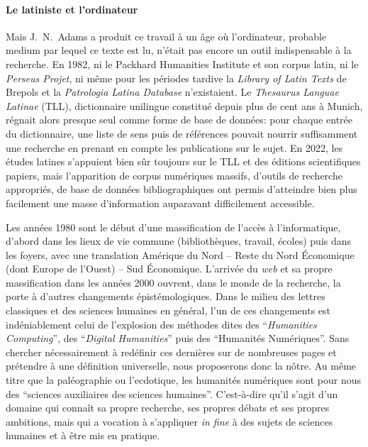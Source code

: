\paragraph{Le latiniste et l'ordinateur}

Mais J.~N.~Adams a produit ce travail à un âge où l'ordinateur, probable medium par lequel ce texte est lu, n'était pas encore un outil indispensable à la recherche. En 1982, ni le Packhard Humanities Institute et son corpus latin, ni le \textit{Perseus Projet}, ni même pour les périodes tardive la \textit{Library of Latin Texts} de Brepols et la \textit{Patrologia Latina Database} n'existaient. Le \textit{Thesaurus Languae Latinae} (TLL), dictionnaire unilingue constitué depuis plus de cent ans à Munich, régnait alors presque seul comme forme de base de données: pour chaque entrée du dictionnaire, une liste de sens puis de références pouvait nourrir suffisamment une recherche en prenant en compte les publications sur le sujet. En 2022, les études latines s'appuient bien sûr toujours sur le TLL et des éditions scientifiques papiers, mais l'apparition de corpus numériques massifs, d'outils de recherche appropriés, de base de données bibliographiques ont permis d'atteindre bien plus facilement une masse d'information auparavant difficilement accessible.

Les années 1980 sont le début d'une massification de l'accès à l'informatique, d'abord dans les lieux de vie commune (bibliothèques, travail, écoles) puis dans les foyers, avec une translation Amérique du Nord -- Reste du Nord Économique (dont Europe de l'Ouest) -- Sud Économique. L'arrivée du \textit{web} et sa propre massification dans les années 2000 ouvrent, dans le monde de la recherche, la porte à d'autres changements épistémologiques. Dans le milieu des lettres classiques et des sciences humaines en général, l'un de ces changements est indéniablement celui de l'explosion des méthodes dites des \enquote{\textit{Humanities Computing}}, des \enquote{\textit{Digital Humanities}} puis des \enquote{Humanités Numériques}. Sans chercher nécessairement à redéfinir ces dernières sur de nombreuses pages et prétendre à une définition universelle, nous proposerons donc la nôtre. Au même titre que la paléographie ou l'ecdotique, les humanités numériques sont pour nous des \enquote{sciences auxiliaires des sciences humaines}. C'est-à-dire qu'il s'agit d'un domaine qui connaît sa propre recherche, ses propres débats et ses propres ambitions, mais qui a vocation à s'appliquer \textit{in fine} à des sujets de sciences humaines et à être mis en pratique. 


